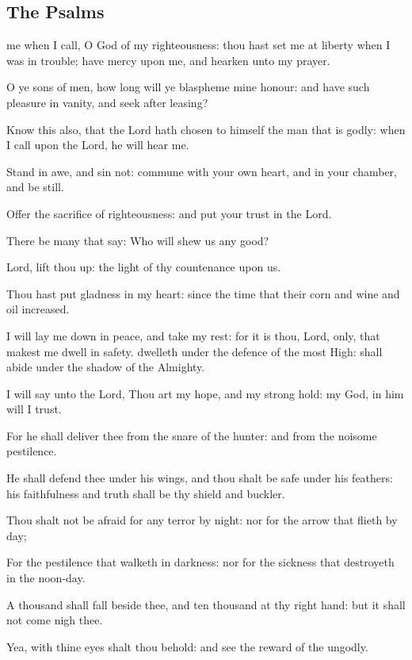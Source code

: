 \subsection{The Psalms}
 me when I call, O God of my righteousness: thou hast set me at liberty when I was in trouble; have mercy upon me, and hearken unto my prayer.
\par
O ye sons of men, how long will ye blaspheme mine honour: and have such pleasure in vanity, and seek after leasing?
\par
Know this also, that the Lord hath chosen to himself the man that is godly: when I call upon the Lord, he will hear me.
\par
Stand in awe, and sin not: commune with your own heart, and in your chamber, and be still.
\par
Offer the sacrifice of righteousness: and put your trust in the Lord.
\par
There be many that say: Who will shew us any good?
\par
Lord, lift thou up: the light of thy countenance upon us.
\par
Thou hast put gladness in my heart: since the time that their corn and wine and oil increased.
\par
I will lay me down in peace, and take my rest: for it is thou, Lord, only, that makest me dwell in safety.
 dwelleth under the defence of the most High: shall abide under the shadow of the Almighty.
\par
I will say unto the Lord, Thou art my hope, and my strong hold: my God, in him will I trust.
\par
For he shall deliver thee from the snare of the hunter: and from the noisome pestilence.
\par
He shall defend thee under his wings, and thou shalt be safe under his feathers: his faithfulness and truth shall be thy shield and buckler.
\par
Thou shalt not be afraid for any terror by night: nor for the arrow that flieth by day;
\par
For the pestilence that walketh in darkness: nor for the sickness that destroyeth in the noon-day.
\par
A thousand shall fall beside thee, and ten thousand at thy right hand: but it shall not come nigh thee.
\par
Yea, with thine eyes shalt thou behold: and see the reward of the ungodly.
\par

